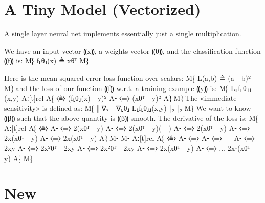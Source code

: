 \documentclass{article}
\begin{document}
\section{A Tiny Model (Vectorized)}

A single layer neural net implements essentially just a single multiplication.

We have an input vector ⸨x⸩, a weights vector ⸨θ⸩, and the
classification function ⸨f⸩ is:
M⁅ f⸤θ⸥(x) ≜ xθᵀ M⁆

Here is the mean squared error loss function over scalars:
M⁅ L(a,b) ≜ (a - b)² M⁆
and the loss of our function ⸨f⸩ {w.r.t.} a training example ⸨y⸩ is:
M⁅ L⸤f⸤θ⸥⸥(x,y) Aː[t]rcl
                A⁅ ⧼≜⧽ (f⸤θ⸥(x) - y)² 
                A⁃ ⧼=⧽ (xθᵀ - y)²
                A⁆
M⁆
The «immediate sensitivity» is defined as:
M⁅ ‖ ∇ₓ ‖ ∇⸤θ⸥ L⸤f⸤θ⸥⸥(x,y) ‖₂ ‖₂
M⁆
We want to know ⸨β⸩ such that the above quantity is ⸨β⸩-smooth.
The derivative of the loss is:
M⁅  Aː[t]rcl
                             A⁅ ⧼≜⧽ 
                             A⁃ ⧼=⧽ 2(xθᵀ - y)
                             A⁃ ⧼=⧽ 2(xθᵀ - y)( - )
                             A⁃ ⧼=⧽ 2(xθᵀ - y)
                             A⁃ ⧼=⧽ 2x(xθᵀ - y)
                             A⁃ ⧼=⧽ 2x(xθᵀ - y)
                             A⁆
M⁃
M⁃  Aː[t]rcl
                             A⁅ ⧼≜⧽ 
                             A⁃ ⧼=⧽ 
                             A⁃ ⧼=⧽  -  - 
                             A⁃ ⧼=⧽  - 2xy
                             A⁃ ⧼=⧽ 2x²θᵀ - 2xy
                             A⁃ ⧼=⧽ 2x²θᵀ - 2xy
                             A⁃ ⧼=⧽ 2x(xθᵀ - y)
                             A⁃ ⧼=⧽ ... 2xᵀ(xθᵀ - y)
                             A⁆
M⁆

\section{New}




\end{document}
